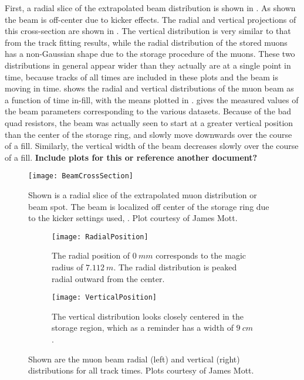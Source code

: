 First, a radial slice of the extrapolated beam distribution is shown in . As shown the beam is off-center due to kicker effects. The radial and vertical projections of this cross-section are shown in . The vertical distribution is very similar to that from the track fitting results, while the radial distribution of the stored muons has a non-Gaussian shape due to the storage procedure of the muons. These two distributions in general appear wider than they actually are at a single point in time, because tracks of all times are included in these plots and the beam is moving in time.  shows the radial and vertical distributions of the muon beam as a function of time in-fill, with the means plotted in .  gives the measured values of the beam parameters corresponding to the various datasets. Because of the bad quad resistors, the beam was actually seen to start at a greater vertical position than the center of the storage ring, and slowly move downwards over the course of a fill. Similarly, the vertical width of the beam decreases slowly over the course of a fill. \textbf{Include plots for this or reference another document?}


\begin{figure}[]
  \centering
  \texttt{[image: BeamCrossSection]}
    \caption[Extrapolated muon beam distribution cross-section]{Shown is a radial slice of the extrapolated muon distribution or beam spot. The beam is localized off center of the storage ring due to the kicker settings used, . Plot courtesy of James Mott.}
    \label{fig:BeamCrossSection}
\end{figure}


\begin{figure}[]
\centering
    \begin{subfigure}[t]{0.47\textwidth}
        \centering
        \texttt{[image: RadialPosition]}
        \caption{The radial position of $\SI{0}{mm}$ corresponds to the magic radius of $\SI{7.112}{m}$. The radial distribution is peaked radial outward from the center.}
    \end{subfigure}
    \hspace{5mm}
    \begin{subfigure}[t]{0.47\textwidth}
        \centering
        \texttt{[image: VerticalPosition]}
        \caption{The vertical distribution looks closely centered in the storage region, which as a reminder has a width of $\SI{9}{cm}$.}
    \end{subfigure}
\caption[Muon beam radial and vertical distributions]{Shown are the muon beam radial (left) and vertical (right) distributions for all track times. Plots courtesy of James Mott.}
\label{fig:RadialVerticalProjections}
\end{figure}


